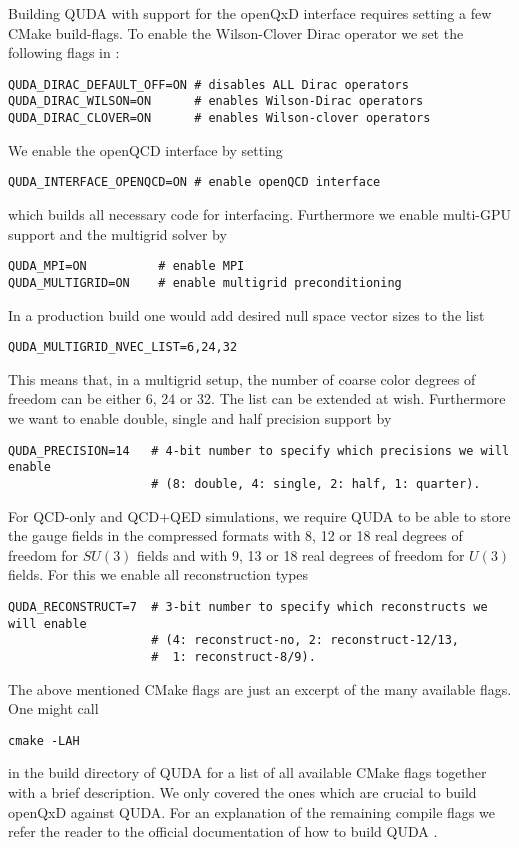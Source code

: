 Building QUDA with support for the openQxD interface requires setting a few CMake build-flags. To enable the Wilson-Clover Dirac operator we set the following flags in  \cite{QUDApaper}:
\begin{verbatim}
QUDA_DIRAC_DEFAULT_OFF=ON # disables ALL Dirac operators
QUDA_DIRAC_WILSON=ON      # enables Wilson-Dirac operators
QUDA_DIRAC_CLOVER=ON      # enables Wilson-clover operators
\end{verbatim}
We enable the openQCD interface by setting
\begin{verbatim}
QUDA_INTERFACE_OPENQCD=ON # enable openQCD interface
\end{verbatim}
which builds all necessary code for interfacing. Furthermore we enable multi-GPU support and the multigrid solver by
\begin{verbatim}
QUDA_MPI=ON          # enable MPI
QUDA_MULTIGRID=ON    # enable multigrid preconditioning
\end{verbatim}
In a production build one would add desired null space vector sizes to the list
\begin{verbatim}
QUDA_MULTIGRID_NVEC_LIST=6,24,32
\end{verbatim}
This means that, in a multigrid setup, the number of coarse color degrees of freedom can be either 6, 24 or 32. The list can be extended at wish. Furthermore we want to enable double, single and half precision support by
\begin{verbatim}
QUDA_PRECISION=14   # 4-bit number to specify which precisions we will enable
                    # (8: double, 4: single, 2: half, 1: quarter).
\end{verbatim}
For QCD-only and QCD+QED simulations, we require QUDA to be able to store the gauge fields in the compressed formats with 8, 12 or 18 real degrees of freedom for $SU(3)$ fields and with 9, 13 or 18 real degrees of freedom for $U(3)$ fields. For this we enable all reconstruction types
\begin{verbatim}
QUDA_RECONSTRUCT=7  # 3-bit number to specify which reconstructs we will enable
                    # (4: reconstruct-no, 2: reconstruct-12/13, 
                    #  1: reconstruct-8/9).
\end{verbatim}
The above mentioned CMake flags are just an excerpt of the many available flags. One might call
\begin{verbatim}
cmake -LAH
\end{verbatim}
in the build directory of QUDA for a list of all available CMake flags together with a brief description. We only covered the ones which are crucial to build openQxD against QUDA. For an explanation of the remaining compile flags we refer the reader to the official documentation of how to build QUDA \cite{github:quda}.

